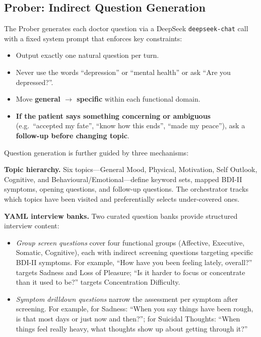 \documentclass[]{ceurart}
\begin{document}
\subsection{Prober: Indirect Question Generation}\label{sec:prober}

The Prober generates each doctor question via a DeepSeek \texttt{deepseek-chat} call with a fixed system prompt that enforces key constraints:
\begin{itemize}
\item Output exactly one natural question per turn.
\item Never use the words ``depression'' or ``mental health'' or ask ``Are you depressed?''.
\item Move \textbf{general $\to$ specific} within each functional domain.
\item \textbf{If the patient says something concerning or ambiguous} (e.g.\ ``accepted my fate'', ``know how this ends'', ``made my peace''), ask a \textbf{follow-up before changing topic}.
\end{itemize}

Question generation is further guided by three mechanisms:

\textbf{Topic hierarchy.}
Six topics---General Mood, Physical, Motivation, Self Outlook, Cognitive, and Behavioural/Emotional---define keyword sets, mapped BDI-II symptoms, opening questions, and follow-up questions.
The orchestrator tracks which topics have been visited and preferentially selects under-covered ones.

\textbf{YAML interview banks.}
Two curated question banks provide structured interview content:
\begin{itemize}
\item \emph{Group screen questions} cover four functional groups (Affective, Executive, Somatic, Cognitive), each with indirect screening questions targeting specific BDI-II symptoms.
For example, ``How have you been feeling lately, overall?'' targets Sadness and Loss of Pleasure; ``Is it harder to focus or concentrate than it used to be?'' targets Concentration Difficulty.
\item \emph{Symptom drilldown questions} narrow the assessment per symptom after screening.
For example, for Sadness: ``When you say things have been rough, is that most days or just now and then?''; for Suicidal Thoughts: ``When things feel really heavy, what thoughts show up about getting through it?''
\end{itemize}
\end{document}
